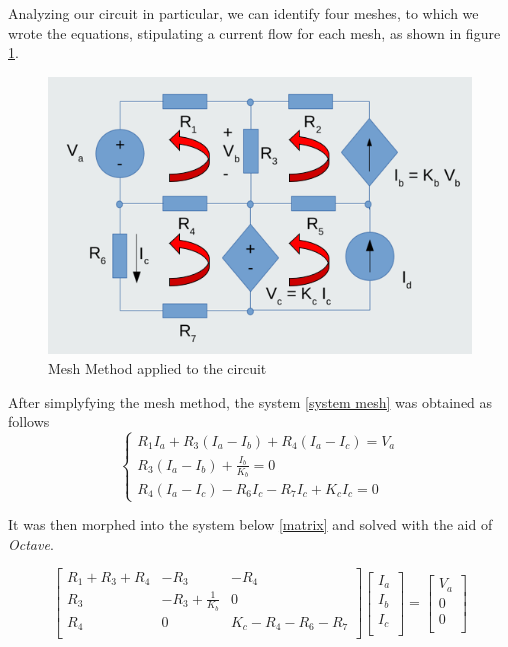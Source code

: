 \par Analyzing our circuit in particular, we can identify four meshes, to which we wrote the equations, stipulating a current flow for each mesh, as shown in figure \ref{mesh}. 

\begin{figure}[H]
    \includegraphics[width=0.5\linewidth]{Mesh.png}
    \centering
    \caption{Mesh Method applied to the circuit}
    \label{mesh}
\end{figure}

\par After simplyfying the mesh method, the system \ref{system mesh} was obtained as follows
$$
\begin{cases} 
	R_{1}I_{a}+R_{3}(I_{a}-I_{b})+R_{4}(I_{a}-I_{c}) = V_a \\ 
	R_{3}(I_{a}-I_{b})+\frac{I_{b}}{K_{b}} = 0 \\
	R_{4}(I_{a}-I_{c})-R_{6}I_{c}-R_{7}I_{c}+K_{c}I_{c} = 0 
\label{system mesh}
\end{cases}
$$


\par It was then morphed into the system below \ref{matrix} and solved with the aid of \textit{Octave}. 

\begin{equation}
	\begin{bmatrix}
		R_1+R_3+R_4 & -R_3 & -R_4 \\
		R_3 & -R_3+\frac{1}{K_b} & 0 \\
		R_4 & 0 & K_c-R_4-R_6-R_7 \\
	\end{bmatrix}
	\begin{bmatrix}
		I_a     \\
		I_b     \\
		I_c \\
	\end{bmatrix}
    =
	\begin{bmatrix}
		V_a     \\
		0     \\
		0  \\
	\end{bmatrix}
	\label{matrix}
\end{equation}

